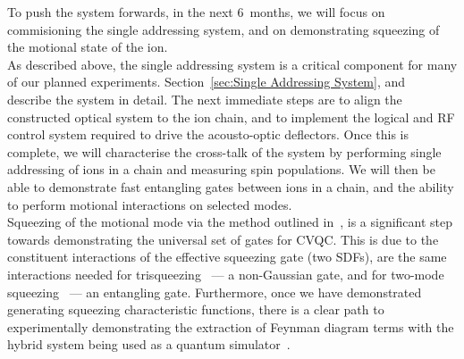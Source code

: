     To push the system forwards, in the next 6~months, we will focus on
    commisioning the single addressing system, and on demonstrating squeezing of
    the motional state of the ion.\\
    As described above, the single addressing system is a critical component for
    many of our planned experiments. Section~\ref{sec:Single Addressing System},
    and~\cite{oevergaard_thesis} describe the system in detail. The next
    immediate steps are to align the constructed optical system to the ion
    chain, and to implement the logical and RF control system required to drive
    the acousto-optic deflectors. Once this is complete, we will characterise
    the cross-talk of the system by performing single addressing of ions in a
    chain and measuring spin populations. We will then be able to demonstrate
    fast entangling gates between ions in a chain, and the ability to perform
    motional interactions on selected modes.\\
    Squeezing of the motional mode via the method outlined
    in~\cite{sutherland_universal_2021}, is a significant step towards
    demonstrating the universal set of gates for CVQC. This is due to
    the constituent interactions of the effective squeezing gate (two SDFs), are
    the same interactions needed for trisqueezing~\cite{braunstein_generalised_1987, bazavan_squeezing_2024} --- a non-Gaussian gate, and
    for two-mode squeezing~\cite{lvovsky_squeezed_2016} --- an entangling gate. Furthermore, once we have
    demonstrated generating squeezing characteristic functions, there is a clear
    path to experimentally demonstrating the extraction of Feynman diagram terms
    with the hybrid system being used as a quantum
    simulator~\cite{varona_towards_2024}.\\
